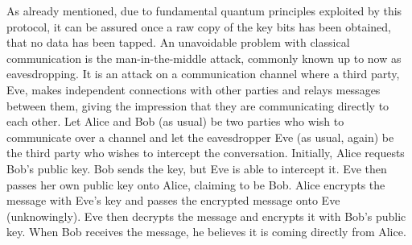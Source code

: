 As already mentioned, due to fundamental quantum principles exploited by this
protocol, it can be assured once a raw copy of the key bits has been obtained, that no
data has been tapped.
An unavoidable problem with classical communication is the man-in-the-middle attack,
commonly known up to now as eavesdropping. It is an attack on a communication channel where a
third party, Eve, makes independent connections with other parties and relays messages between
them, giving the impression that they are communicating directly to each other. Let Alice
and Bob (as usual) be two parties who wish to communicate over a channel and let the eavesdropper
Eve (as usual, again) be the third party who wishes to intercept the conversation. 
Initially, Alice requests Bob's public key. Bob sends the key, but Eve is able to intercept it. 
Eve then passes her own public key onto Alice, claiming to be Bob. 
Alice encrypts the message with Eve's key and passes the encrypted message onto Eve (unknowingly). 
Eve then decrypts the message and encrypts it with Bob's public key. 
When Bob receives the message, he believes it is coming directly from Alice.

